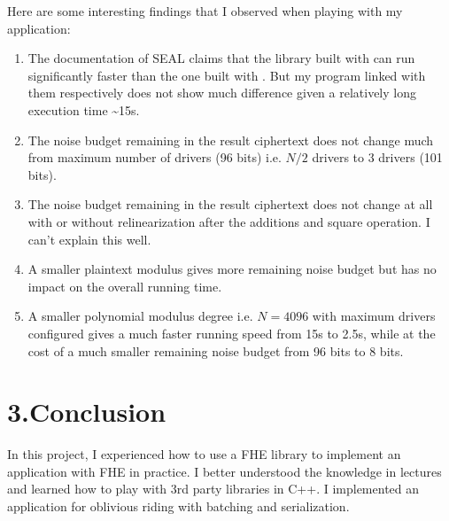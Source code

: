 \documentclass[12pt]{article}
\begin{document}
\noindent{}Here are some interesting findings that I observed when playing with my application:%

\begin{enumerate}[noitemsep,topsep=\mdcompacttopsep]%

\item{}The documentation of SEAL claims that the library built with  can run significantly faster than the one built with . But my program linked with them respectively does not show much difference given a relatively long execution time \textasciitilde{}15s.%

\item{}The noise budget remaining in the result ciphertext does not change much from maximum number of drivers (96 bits) i.e. $N/2$ drivers to 3 drivers (101 bits).%

\item{}The noise budget remaining in the result ciphertext does not change at all with or without relinearization after the additions and square operation. I can't explain this well.%

\item{}A smaller plaintext modulus gives more remaining noise budget but has no impact on the overall running time.%

\item{}A smaller polynomial modulus degree i.e. $N=4096$ with maximum drivers configured gives a much faster running speed from 15s to 2.5s, while at the cost of a much smaller remaining noise budget from 96 bits to 8 bits.%
\end{enumerate}%

\section{3.\hspace*{0.5em}Conclusion}\label{sec-conclusion}%

\noindent{}In this project, I experienced how to use a FHE library to implement an application with FHE in practice. I better understood the knowledge in lectures and learned how to play with 3rd party libraries in C++. I implemented an application for oblivious riding with batching and serialization.%
\end{document}
